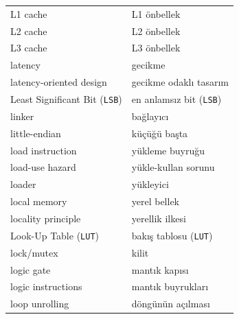 {\begin{longtable}{@{}p{7.6cm}p{7.6cm}@{}}
L1 cache & L1 önbellek \\
L2 cache & L2 önbellek \\
L3 cache & L3 önbellek \\
latency & gecikme \\
latency-oriented design & gecikme odaklı tasarım \\
Least Significant Bit (\texttt{LSB}) & en anlamsız bit (\texttt{LSB}) \\
linker & bağlayıcı \\
little-endian & küçüğü başta \\
load instruction & yükleme buyruğu \\
load-use hazard & yükle-kullan sorunu \\
loader & yükleyici \\
local memory & yerel bellek \\
locality principle & yerellik ilkesi \\
Look-Up Table (\texttt{LUT}) & bakış tablosu (\texttt{LUT}) \\
lock/mutex & kilit \\
logic gate & mantık kapısı \\
logic instructions & mantık buyrukları \\
loop unrolling & döngünün açılması \\


\end{longtable}}
